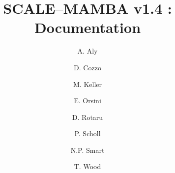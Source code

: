 \documentclass{article}
\begin{document}
\newcommand{\mainsection}[1]{\newpage \section{#1}}
\newcommand{\msubsection}[1]{\newpage \subsection{#1}}
\newcommand{\msubsubsection}[1]{\subsubsection{#1}}

\title{SCALE--MAMBA v1.4 : Documentation}
\author{
A. Aly
\and D. Cozzo
\and M. Keller 
\and E. Orsini
\and D. Rotaru 
\and P. Scholl 
\and N.P. Smart
\and T. Wood}

\maketitle

\tableofcontents























\end{document}
